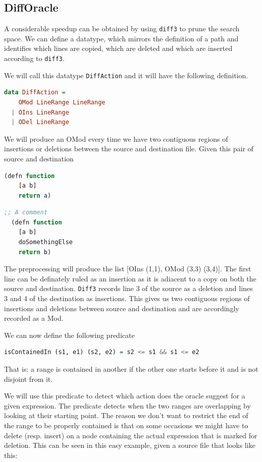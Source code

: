 \documentclass[11pt]{article}
\begin{document}
\subsection{DiffOracle}
A considerable speedup can be obtained by using \texttt{diff3} to prune the 
search space. We can define a datatype, which mirrors the definition of a path 
and identifies which lines are copied, which are deleted and which are inserted 
according to \texttt{diff3}.

We will call this datatype \texttt{DiffAction} and it will have the following 
definition.

\begin{lstlisting}[language=haskell]
  data DiffAction = 
    OMod LineRange LineRange
  | OIns LineRange
  | ODel LineRange  
\end{lstlisting}

We will produce an OMod every time we have two contiguous regions of insertions 
or deletions between the source and destination file.
Given this pair of source and destination
\begin{lstlisting}[language=lisp]
  (defn function
    [a b]
    return a)
\end{lstlisting}

\begin{lstlisting}[language=lisp]
  ;; A comment
  (defn function
    [a b]
    doSomethingElse
    return b)
\end{lstlisting}

The preprocessing will produce the list [OIns (1,1), OMod (3,3) (3,4)]. The 
first line can be definately ruled as an insertion as it is adiacent to a copy 
on both the source and destination. \texttt{Diff3} records line 3 of the source 
as a deletion and lines 3 and 4 of the destination as insertions. This gives us 
two contiguous regions of insertions and deletions between source and 
destination and are accordingly recorded as a Mod. 

We can now define the following predicate

\begin{lstlisting}[language=haskell]
  isContainedIn (s1, e1) (s2, e2) = s2 <= s1 && s1 <= e2
\end{lstlisting}
That is: a range is contained in another if the other one starts before it and 
is not disjoint from it.

We will use this predicate to detect which action does the oracle suggest for 
a given expression. The predicate detects when the two ranges are overlapping by 
looking at their starting point. The reason we don't want to restrict the end of 
the range to be properly contained is that on some occasions we might have to 
delete (resp. insert) on a node containing the actual expression that is marked for 
deletion. This can be seen in this easy example, given a source file that looks 
like this:
\end{document}
